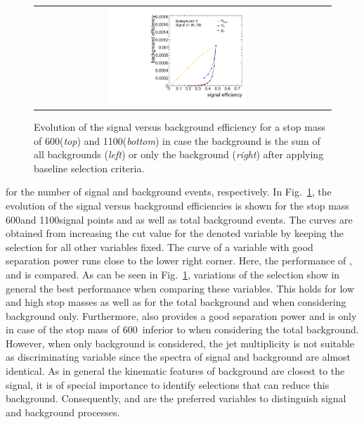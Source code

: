 \begin{figure}[!t]
{\begin{tabular}{cc}
                \includegraphics[width=0.49\textwidth]{figures/CutScan_DeltaPhiSelection_TTbar_powheg_13TeV_Stop1100_LSP50_T2tt_13TeV_HT_MET_MHT_NJets.pdf}
  \end{tabular}}
  \caption{Evolution of the signal versus background efficiency for a stop mass of 600\gev (\textit{top}) and 1100\gev (\textit{bottom}) in case the background is the sum of all backgrounds (\textit{left}) or only the \ttbar background (\textit{right}) after applying baseline selection criteria.}
  \label{fig:stop_baseline_cutscan_ht_met_mht_njets}
\end{figure}
for the number of signal and background events, respectively. In Fig.~\ref{fig:stop_baseline_cutscan_ht_met_mht_njets}, the evolution of the signal versus background efficiencies is shown for the stop mass 600\gev and 1100\gev signal points and \ttbar as well as total background events. The curves are obtained from increasing the cut value for the denoted variable by keeping the selection for all other variables fixed. The curve of a variable with good separation power runs close to the lower right corner. Here, the performance of \HT, \met and \NJets is compared. %
As can be seen in Fig.~\ref{fig:stop_baseline_cutscan_ht_met_mht_njets}, variations of the \met selection show in general the best performance when comparing these variables. This holds for low and high stop masses as well as for the total background and when considering \ttbar background only. Furthermore, also \HT provides a good separation power and is only in case of the stop mass of 600~\gev inferior to \NJets when considering the total background. However, when only \ttbar background is considered, the jet multiplicity is not suitable as discriminating variable since the \NJets spectra of signal and \ttbar background are almost identical. As in general the kinematic features of \ttbar background are closest to the signal, it is of special importance to identify selections that can reduce this background. Consequently, \met and \HT are the preferred variables to distinguish signal and background processes. 
